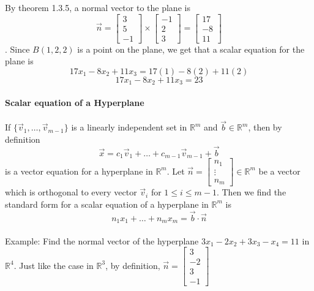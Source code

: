 \documentclass[10pt,letter]{article}
\begin{document}
By theorem 1.3.5, a normal vector to the plane is $$\vec{n}=\begin{bmatrix}3\\5\\-1\end{bmatrix}\times\begin{bmatrix}-1\\2\\3\end{bmatrix}=\begin{bmatrix}17\\-8\\11\end{bmatrix}$$. Since $B(1,2,2)$ is a point on the plane, we get that a scalar equation for the plane is $$17x_1-8x_2+11x_3=17(1)-8(2)+11(2)$$ $$17x_1-8x_2+11x_3=23$$

\paragraph{Scalar equation of a Hyperplane} If $\{\vec{v}_1,\ldots,\vec{v}_{m-1}\}$ is a linearly independent set in $\mathbb{R}^m$ and $\vec{b}\in\mathbb{R}^m$, then by definition $$\vec{x}=c_1\vec{v}_1+\ldots+c_{m-1}\vec{v}_{m-1}+\vec{b}$$ is a vector equation for a hyperplane in $\mathbb{R}^m$. Let $\vec{n}=\begin{bmatrix}n_1\\\vdots\\n_m\end{bmatrix}\in\mathbb{R}^m$ be a vector which is orthogonal to every vector $\vec{v}_i$ for $1\leq i\leq m-1$. Then we find the standard form for a scalar equation of a hyperplane in $\mathbb{R}^m$ is $$n_1x_1+\ldots+n_mx_m=\vec{b}\cdot\vec{n}$$ \\ 
Example: Find the normal vector of the hyperplane $3x_1-2x_2+3x_3-x_4=11$ in $\mathbb{R}^4$. Just like the case in $\mathbb{R}^3$, by definition, $\vec{n}=\begin{bmatrix}3\\-2\\3\\-1\end{bmatrix}$
\end{document}
